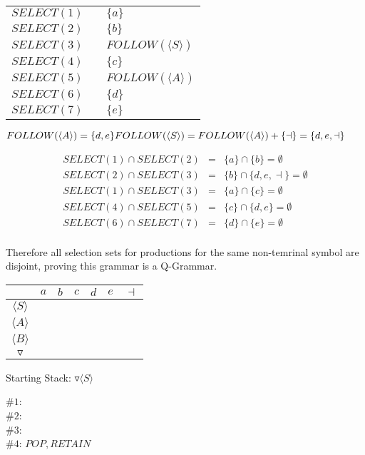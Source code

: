 \documentclass[a4paper,12pt]{article}
\newcommand{\nonterminal}[1]{\langle #1 \rangle}
\begin{document}
\begin{tabular}{lcl}
$SELECT(1)$	&	\hspace{10mm}	&	$\{a\}$	\\
$SELECT(2)$	&						&	$\{b\}$	\\
$SELECT(3)$	&						&	$FOLLOW(\nonterminal{S})$	\\
$SELECT(4)$	&						&	$\{c\}$	\\
$SELECT(5)$	&						&	$FOLLOW(\nonterminal{A})$	\\
$SELECT(6)$	&						&	$\{d\}$	\\
$SELECT(7)$	&						&	$\{e\}$	\\
\end{tabular}

$FOLLOW(\nonterminal{A}) = \{d,e\} \\
FOLLOW(\nonterminal{S}) = FOLLOW(\nonterminal{A}) + \{\dashv\} =
\{d,e,\dashv\}$

\begin{eqnarray*}
SELECT(1) \cap	SELECT(2)	&	=	&	\{a\} \cap \{b\}	= \emptyset	\\ 
SELECT(2) \cap	SELECT(3)	&	=	&	\{b\} \cap \{d,e,\dashv\}	= \emptyset	\\ 
SELECT(1) \cap	SELECT(3)	&	=	&	\{a\} \cap \{c\}	= \emptyset	\\ 
SELECT(4) \cap	SELECT(5)	&	=	&	\{c\} \cap \{d,e\}	= \emptyset	\\ 
SELECT(6) \cap	SELECT(7)	&	=	&	\{d\} \cap \{e\}	= \emptyset	\\ 
\end{eqnarray*}

Therefore all selection sets for productions for the same non-temrinal
symbol are disjoint, proving this grammar is a Q-Grammar.

\begin{tabular}{|c|c|c|c|c|c|c|}
\hline
						&	$a$	&	$b$	&	$c$	&	$d$	&	$e$	&	$\dashv$ \\
\hline
$\nonterminal{S}$	&			&			&			&			&			&				\\
\hline
$\nonterminal{A}$	&			&			&			&			&			&				\\
\hline
$\nonterminal{B}$	&			&			&			&			&			&				\\
\hline
$\triangledown$	&			&			&			&			&			&				\\
\hline
\end{tabular}

Starting Stack: $\triangledown \nonterminal{S}$

$\#1$: $ $ \\
$\#2$: $ $ \\
$\#3$: $ $ \\
$\#4$: $POP,RETAIN$ \\
\end{document}
